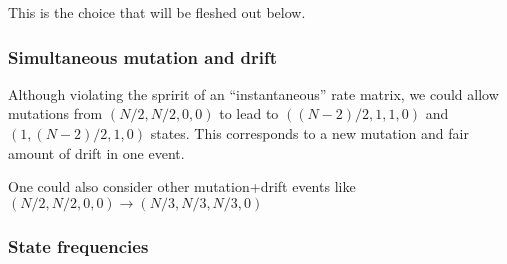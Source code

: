 \documentclass{llncs}
\begin{document}
This is the choice that will be fleshed out below.

\subsubsection*{Simultaneous mutation and drift}
Although violating the spririt of an ``instantaneous'' rate matrix, we
could allow mutations from $(N/2, N/2, 0, 0)$ to lead to $((N-2)/2, 1, 1, 0)$ and $(1, (N-2)/2, 1, 0)$ states.
This corresponds to a new mutation and fair amount of drift in one event.

One could also consider other mutation+drift events like $(N/2, N/2, 0, 0)\rightarrow(N/3, N/3, N/3, 0)$

\subsubsection*{State frequencies}
\end{document}
